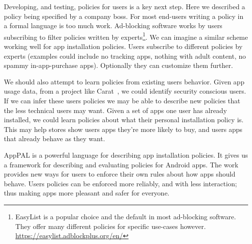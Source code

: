 \documentclass[]{scrartcl}
\begin{document}
Developing, and testing, policies for users is a key next step.
Here we described a policy being specified by a company boss.
For most end-users writing a policy in a formal language is too much work.
Ad-blocking software works by users subscribing to filter policies written by experts\footnote{EasyList is a popular choice and the default in most ad-blocking software. They offer many different policies for specific use-cases however. \url{https://easylist.adblockplus.org/en/}}.
We can imagine a similar scheme working well for app installation policies.
Users subscribe to different policies by experts (examples could include no tracking apps, nothing with adult content, no spammy in-app-purchase apps).
Optionally they can customize them further.

We should also attempt to learn policies from existing users behavior.
Given app usage data, from a project like Carat~\citep{Oliner:2013ht}, we could identify security conscious users.
If we can infer these users policies we may be able to describe new policies that the less technical users may want.
Given a set of apps one user has already installed, we could learn policies about what their personal installation policy is.
This may help stores show users apps they're more likely to buy, and users apps that already behave as they want.

AppPAL is a powerful language for describing app installation policies.
It gives us a framework for describing and evaluating policies for Android apps.
The work provides new ways for users to enforce their own rules about how apps should behave.
Users policies can be enforced more reliably, and with less interaction;
thus making apps more pleasant and safer for everyone.



\end{document}
